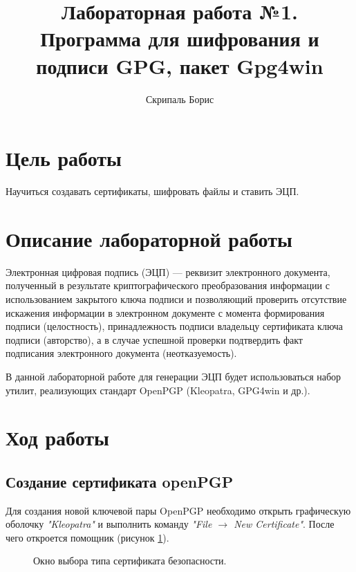\documentclass[10pt,a4paper]{report}
\author{Скрипаль Борис}
\title{Лабораторная работа №1.\\
	Программа для шифрования и подписи GPG, пакет Gpg4win}
\begin{document}
\maketitle
\tableofcontents
\pagebreak

\section{Цель работы}
Научиться создавать сертификаты, шифровать файлы и ставить ЭЦП.
\section{Описание лабораторной работы}
Электронная цифровая подпись (ЭЦП) — реквизит электронного документа, полученный в результате криптографического преобразования информации с использованием закрытого ключа подписи и позволяющий проверить отсутствие искажения информации в электронном документе с момента формирования подписи (целостность), принадлежность подписи владельцу сертификата ключа подписи (авторство), а в случае успешной проверки подтвердить факт подписания электронного документа (неотказуемость).

В данной лабораторной работе для генерации ЭЦП будет использоваться набор утилит, реализующих стандарт OpenPGP (Kleopatra, GPG4win и др.).
\section{Ход работы}
\subsection{Создание сертификата openPGP}
Для создания новой ключевой пары OpenPGP необходимо открыть графическую оболочку \textit{"Kleopatra"} и выполнить команду \textit{"File \begin{math}\to\end{math} New Certificate"}. После чего откроется помощник (рисунок \ref{ris:step11}).

\begin{figure}[h]
	\caption{Окно выбора типа сертификата безопасности.}
	\label{ris:step11}
\end{figure}
\end{document}
